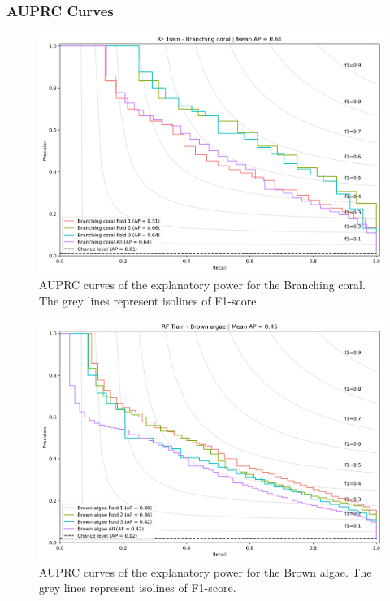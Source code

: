 \hypertarget{auprc-curves}{%
\subsubsection*{AUPRC Curves}\label{auprc-curves}}

\begin{figure}
\hypertarget{fig:chap3figS22}{%
\centering
\includegraphics{03-Chapitre3/figures/supplementary/03-precision_recall_curve_train_rf_Branching coral.png}
\caption{AUPRC curves of the explanatory power for the Branching coral.
The grey lines represent isolines of F1-score.}\label{fig:chap3figS22}
}
\end{figure}

\begin{figure}
\hypertarget{fig:chap3figS23}{%
\centering
\includegraphics{03-Chapitre3/figures/supplementary/03-precision_recall_curve_train_rf_Brown algae.png}
\caption{AUPRC curves of the explanatory power for the Brown algae. The
grey lines represent isolines of F1-score.}\label{fig:chap3figS23}
}
\end{figure}

